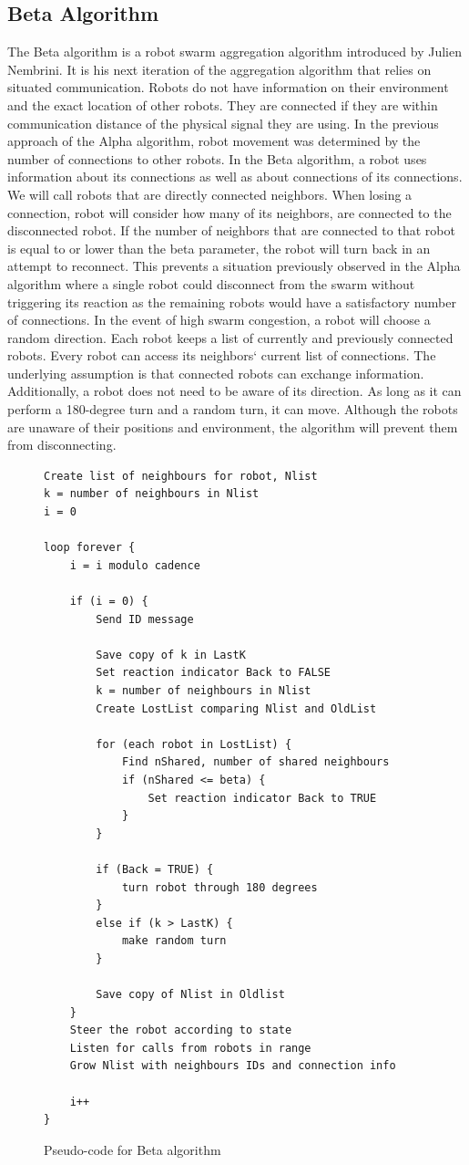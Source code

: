\newpage
\subsection{Beta Algorithm}
The Beta algorithm is a robot swarm aggregation algorithm introduced by Julien Nembrini. It is his next iteration of the aggregation algorithm that relies on situated communication. Robots do not have information on their environment and the exact location of other robots. They are connected if they are within communication distance of the physical signal they are using. In the previous approach of the Alpha algorithm, robot movement was determined by the number of connections to other robots. In the Beta algorithm, a robot uses information about its connections as well as about connections of its connections. We will call robots that are directly connected neighbors. When losing a connection, robot will consider how many of its neighbors, are connected to the disconnected robot. If the number of neighbors that are connected to that robot is equal to or lower than the beta parameter, the robot will turn back in an attempt to reconnect. This prevents a situation previously observed in the Alpha algorithm where a single robot could disconnect from the swarm without triggering its reaction as the remaining robots would have a satisfactory number of connections. In the event of high swarm congestion, a robot will choose a random direction. Each robot keeps a list of currently and previously connected robots. Every robot can access its neighbors` current list of connections. The underlying assumption is that connected robots can exchange information. Additionally, a robot does not need to be aware of its direction. As long as it can perform a 180-degree turn and a random turn, it can move. Although the robots are unaware of their positions and environment, the algorithm will prevent them from disconnecting.

\begin{figure}
\caption{Pseudo-code for Beta algorithm \cite{Nembrini2002}}
\begin{lstlisting}[style=code]
Create list of neighbours for robot, Nlist
k = number of neighbours in Nlist
i = 0

loop forever {
	i = i modulo cadence

	if (i = 0) {
		Send ID message

		Save copy of k in LastK
		Set reaction indicator Back to FALSE
		k = number of neighbours in Nlist
		Create LostList comparing Nlist and OldList

		for (each robot in LostList) {
			Find nShared, number of shared neighbours
			if (nShared <= beta) {
				Set reaction indicator Back to TRUE
			}
		}

		if (Back = TRUE) {
			turn robot through 180 degrees
		}
		else if (k > LastK) {
			make random turn
		}
		
		Save copy of Nlist in Oldlist
	}
	Steer the robot according to state
	Listen for calls from robots in range
	Grow Nlist with neighbours IDs and connection info

	i++
}
\end{lstlisting}
\label{fig:pseudocode}
\end{figure}


